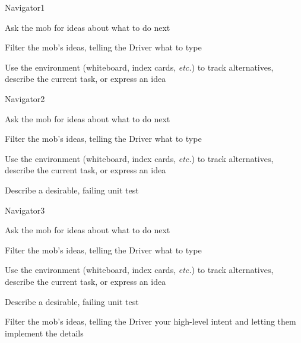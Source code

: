 \documentclass[letterpaper,20pt]{extarticle}
\begin{document}
\begin{role}{Navigator}{1}
  \item Ask the mob for ideas about what to do next
  \item Filter the mob's ideas, telling the Driver what to type
  \item Use the environment (whiteboard, index cards, \textit{etc.}) to
    track alternatives, describe the current task, or express
    an idea
\end{role}

\begin{role}{Navigator}{2}
  \item Ask the mob for ideas about what to do next
  \item Filter the mob's ideas, telling the Driver what to type
  \item Use the environment (whiteboard, index cards, \textit{etc.}) to
    track alternatives, describe the current task, or express
    an idea
  \item Describe a desirable, failing unit test
\end{role}

\begin{role}{Navigator}{3}
  \item Ask the mob for ideas about what to do next
  \item Filter the mob's ideas, telling the Driver what to type
  \item Use the environment (whiteboard, index cards, \textit{etc.}) to
    track alternatives, describe the current task, or express
    an idea
  \item Describe a desirable, failing unit test
  \item Filter the mob's ideas, telling the Driver your high-level
    intent and letting them implement the details
\end{role}
\end{document}
